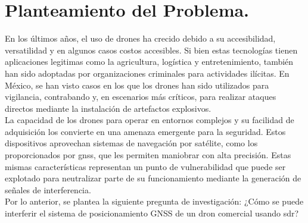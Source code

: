 \chapter*{Planteamiento del Problema.}

\begin{justify}
    En los últimos años, el uso de drones ha crecido debido a su accesibilidad, versatilidad y en algunos casos costos accesibles.
    Si bien estas tecnologías tienen aplicaciones legitimas como la agricultura, logística y entretenimiento,
    también han sido adoptadas por organizaciones criminales para actividades ilícitas. En México, 
    se han visto casos en los que los drones han sido utilizados para vigilancia, contrabando y,
    en escenarios más críticos, para realizar ataques directos mediante la instalación de artefactos explosivos.\\ 

    \noindent La capacidad de los drones para operar en entornos complejos y su facilidad de adquisición los convierte
    en una amenaza emergente para la seguridad. Estos dispositivos aprovechan sistemas de navegación por satélite,
    como los proporcionados por \gls{gnss}, que les permiten maniobrar con alta precisión.
    Estas mismas características representan un punto de vulnerabilidad que puede ser explotado para neutralizar parte de su
    funcionamiento mediante la generación de señales de interferencia.\\

    \noindent Por lo anterior, se plantea la siguiente pregunta de investigación:
    ¿Cómo se puede interferir el sistema de posicionamiento GNSS de un dron comercial usando \gls{sdr}?
\end{justify}